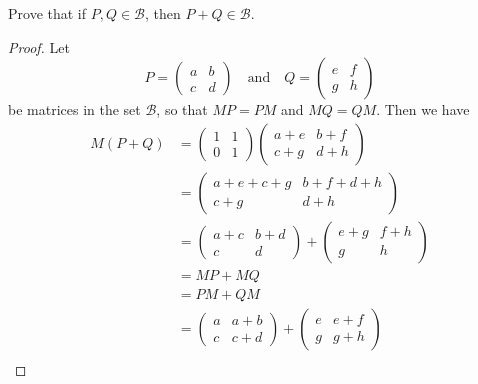 Prove that if $P, Q \in\mathcal{B}$, then $P + Q\in\mathcal{B}$.
\begin{proof}
  Let
  \begin{equation*}
    P = \begin{pmatrix}
      a & b \\ c & d
    \end{pmatrix}
    \quad\text{and}\quad
    Q = \begin{pmatrix}
      e & f \\ g & h
    \end{pmatrix}
  \end{equation*}
  be matrices in the set $\mathcal{B}$, so that $MP = PM$ and
  $MQ = QM$. Then we have
  \begin{align*}
    M(P + Q) &= \begin{pmatrix} 1 & 1 \\ 0 & 1 \end{pmatrix}
                \begin{pmatrix} a + e & b + f \\ c + g & d + h \end{pmatrix} \\
             &= \begin{pmatrix}
               a + e + c + g & b + f + d + h \\
               c + g & d + h
             \end{pmatrix} \\
             &= \begin{pmatrix}
               a + c & b + d \\
               c & d
             \end{pmatrix}
                   + \begin{pmatrix}
                     e + g & f + h \\
                     g & h
                   \end{pmatrix} \\
             &= MP + MQ \\
             &= PM + QM \\
             &= \begin{pmatrix}
               a & a + b \\
               c & c + d
             \end{pmatrix}
                   + \begin{pmatrix}
                     e & e + f \\
                     g & g + h
                   \end{pmatrix} \\

\end{align*}
\end{proof}
